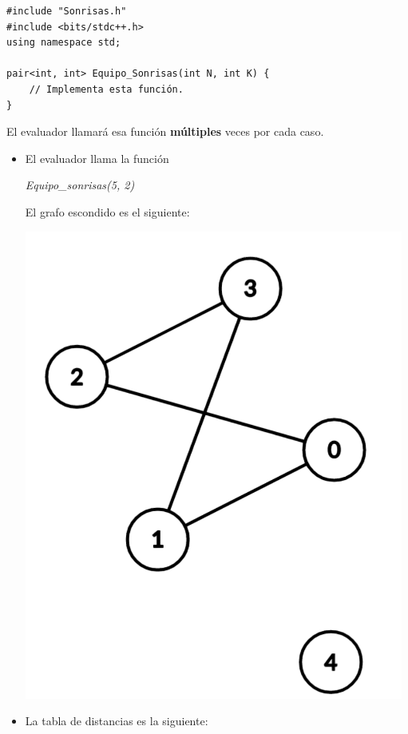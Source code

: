\documentclass[12pt]{scrartcl}
\begin{document}
\begin{verbatim}
#include "Sonrisas.h"
#include <bits/stdc++.h>
using namespace std;

pair<int, int> Equipo_Sonrisas(int N, int K) {
    // Implementa esta función.
}

\end{verbatim}

    El evaluador llamará esa función \textbf{múltiples} veces por cada caso.
    

        \begin{itemize}
            \item El evaluador llama la función 
            \begin{center}
                \textit{Equipo\_sonrisas(5, 2)}
            \end{center}
            El grafo escondido es el siguiente:
            \begin{center}
                \includegraphics[scale=0.3]{ej1.png}
            \end{center}
            \item La tabla de distancias es la siguiente:
            

\end{itemize}
\end{document}
